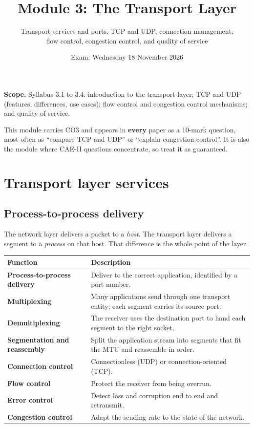 \documentclass[11pt,a4paper]{article}
\title{\textbf{Module 3: The Transport Layer}\\}
\author{\large Transport services and ports, TCP and UDP, connection management,\\
flow control, congestion control, and quality of service}
\date{Exam: Wednesday 18 November 2026}
\begin{document}
\maketitle

\begin{exambox}
\textbf{Scope.} Syllabus 3.1 to 3.4: introduction to the transport layer; TCP and UDP (features, differences, use cases); flow control and congestion control mechanisms; and quality of service.

This module carries CO3 and appears in \textbf{every} paper as a 10-mark question, most often as ``compare TCP and UDP'' or ``explain congestion control''. It is also the module where CAE-II questions concentrate, so treat it as guaranteed.
\end{exambox}

\tableofcontents
\newpage

\section{Transport layer services}

\subsection{Process-to-process delivery}

The network layer delivers a packet to a \emph{host}. The transport layer delivers a segment to a \emph{process} on that host. That difference is the whole point of the layer.

\begin{center}\small
\begin{tabularx}{\textwidth}{>{\bfseries}p{} X}
\toprule Function & Description\\
\midrule
Process-to-process delivery & Deliver to the correct application, identified by a port number.\\
Multiplexing & Many applications send through one transport entity; each segment carries its source port.\\
Demultiplexing & The receiver uses the destination port to hand each segment to the right socket.\\
Segmentation and reassembly & Split the application stream into segments that fit the MTU and reassemble in order.\\
Connection control & Connectionless (UDP) or connection-oriented (TCP).\\
Flow control & Protect the receiver from being overrun.\\
Error control & Detect loss and corruption end to end and retransmit.\\
Congestion control & Adapt the sending rate to the state of the network.\\
\bottomrule
\end{tabularx}
\end{center}
\end{document}
